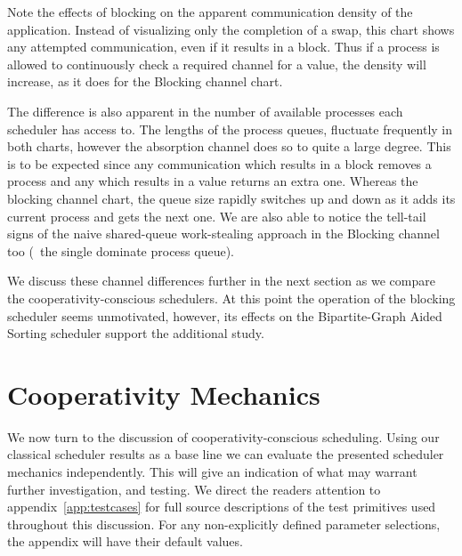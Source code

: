 Note the effects of blocking on the apparent communication density of the 
application. Instead of visualizing only the completion of a swap, this chart
shows any attempted communication, even if it results in a block. Thus if a 
process is allowed to continuously check a required channel for a value, the 
density will increase, as it does for the Blocking channel chart. 

The difference is also apparent in the number of available processes each scheduler has
access to. The lengths of the process queues, fluctuate frequently in both
charts, however the absorption channel does so to quite a large degree. This
is to be expected since any communication which results in a block 
removes a process and any which results in a value returns an extra one.
Whereas the blocking channel chart, the queue size rapidly switches up and
down as it adds its current process and gets the next one. We are also able 
to notice the tell-tail signs of the naive shared-queue work-stealing approach 
in the Blocking channel too (\ie~the single dominate process queue).

We discuss these channel differences further in the next section as we compare 
the cooperativity-conscious schedulers. At this point the operation of the 
blocking scheduler seems unmotivated, however, its effects on the 
Bipartite-Graph Aided Sorting scheduler support the additional study.


\section{Cooperativity Mechanics}\label{sec:results-evaluation-feedback}

We now turn to the discussion of cooperativity-conscious scheduling.
Using our classical scheduler results as a base line we can evaluate 
the presented scheduler mechanics independently. This will give an indication of what
may warrant further investigation, and testing. We direct the readers attention
to appendix~\ref{app:testcases} for full source descriptions of the test 
primitives used throughout this discussion. For any non-explicitly defined
parameter selections, the appendix will have their default values.

